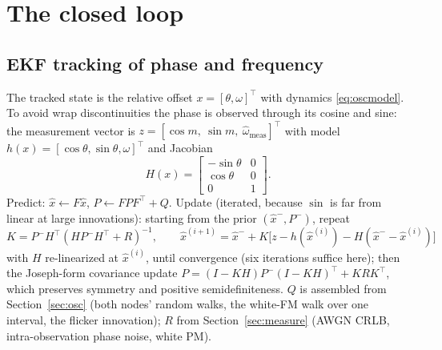 \documentclass[10pt]{article}
\begin{document}
\section{The closed loop}
\label{sec:loop}

\subsection{EKF tracking of phase and frequency}
The tracked state is the relative offset $x=[\theta,\omega]^\top$ with
dynamics \eqref{eq:oscmodel}. To avoid wrap discontinuities the phase is
observed through its cosine and sine: the measurement vector is
$z=[\cos m,\ \sin m,\ \hat\omega_{\mathrm{meas}}]^\top$ with model
$h(x)=[\cos\theta,\sin\theta,\omega]^\top$ and Jacobian
\begin{equation}
H(x)=\begin{bmatrix}-\sin\theta & 0\\ \cos\theta & 0\\ 0 & 1\end{bmatrix}.
\end{equation}
Predict: $\hat x\leftarrow F\hat x$, $P\leftarrow FPF^\top+Q$. Update
(iterated, because $\sin$ is far from linear at large innovations):
starting from the prior $(\hat x^-,P^-)$, repeat
\begin{equation}
K=P^-H^\top(HP^-H^\top+R)^{-1},\qquad
\hat x^{(i+1)}=\hat x^- + K\bigl[z-h(\hat x^{(i)})-H(\hat x^--\hat x^{(i)})\bigr]
\end{equation}
with $H$ re-linearized at $\hat x^{(i)}$, until convergence (six
iterations suffice here); then the Joseph-form covariance update
$P=(I{-}KH)P^-(I{-}KH)^\top+KRK^\top$, which preserves symmetry and
positive semidefiniteness. $Q$ is assembled from
Section~\ref{sec:osc} (both nodes' random walks, the white-FM walk over
one interval, the flicker innovation); $R$ from
Section~\ref{sec:measure} (AWGN CRLB, intra-observation phase noise,
white PM).
\end{document}

